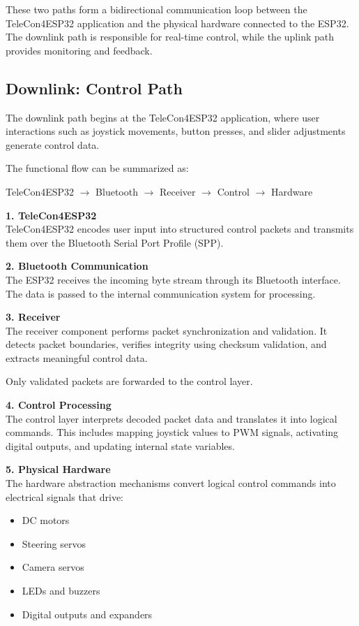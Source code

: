 These two paths form a bidirectional communication loop between the TeleCon4ESP32 application and the physical hardware connected to the ESP32. The downlink path is responsible for real-time control, while the uplink path provides monitoring and feedback.

\subsection{Downlink: Control Path}

The downlink path begins at the TeleCon4ESP32 application, where user interactions such as joystick movements, button presses, and slider adjustments generate control data.

The functional flow can be summarized as:

\begin{center}
	TeleCon4ESP32 $\rightarrow$ Bluetooth $\rightarrow$ Receiver $\rightarrow$ Control $\rightarrow$ Hardware
\end{center}

\textbf{1. TeleCon4ESP32} \\
TeleCon4ESP32 encodes user input into structured control packets and transmits them over the Bluetooth Serial Port Profile (SPP).

\textbf{2. Bluetooth Communication} \\
The ESP32 receives the incoming byte stream through its Bluetooth interface. The data is passed to the internal communication system for processing.

\textbf{3. Receiver} \\
The receiver component performs packet synchronization and validation. It detects packet boundaries, verifies integrity using checksum validation, and extracts meaningful control data.

Only validated packets are forwarded to the control layer.

\textbf{4. Control Processing} \\
The control layer interprets decoded packet data and translates it into logical commands. This includes mapping joystick values to PWM signals, activating digital outputs, and updating internal state variables.

\textbf{5. Physical Hardware} \\
The hardware abstraction mechanisms convert logical control commands into electrical signals that drive:

\begin{itemize}
	\item DC motors
	\item Steering servos
	\item Camera servos
	\item LEDs and buzzers
	\item Digital outputs and expanders
\end{itemize}

